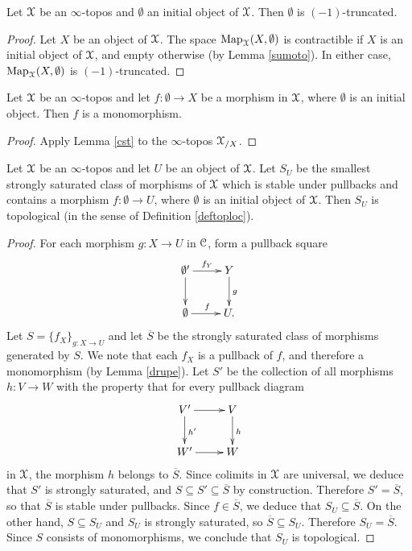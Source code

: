 \begin{lemma}\label{cst}
Let $\operatorname{\mathcal{X}}$ be an $\infty$-topos and $\emptyset$ an initial object of $\operatorname{\mathcal{X}}$. Then $\emptyset$ is $(-1)$-truncated.
\end{lemma}

\begin{proof}
Let $X$ be an object of $\operatorname{\mathcal{X}}$. The space $\operatorname{{Map}}_{\operatorname{\mathcal{X}}}(X, \emptyset)$ is contractible if $X$ is an initial object of $\operatorname{\mathcal{X}}$, and empty otherwise (by Lemma \ref{sumoto}). In either case,
$\operatorname{{Map}}_{\operatorname{\mathcal{X}}}(X, \emptyset)$ is $(-1)$-truncated.
\end{proof}

\begin{lemma}\label{drupe}
Let $\operatorname{\mathcal{X}}$ be an $\infty$-topos and let $f: \emptyset \rightarrow X$ be a morphism in $\operatorname{\mathcal{X}}$, where $\emptyset$ is an initial object. Then $f$ is a monomorphism.
\end{lemma}

\begin{proof}
Apply Lemma \ref{cst} to the $\infty$-topos $\operatorname{\mathcal{X}}_{/X}$.
\end{proof}

\begin{proposition}\label{turb}
Let $\operatorname{\mathcal{X}}$ be an $\infty$-topos and let $U$ be an object of $\operatorname{\mathcal{X}}$. Let
$S_{U}$ be the smallest strongly saturated class of morphisms of $\operatorname{\mathcal{X}}$ which is stable under pullbacks and contains a morphism $f: \emptyset \rightarrow U$, where $\emptyset$ is an initial object of $\operatorname{\mathcal{X}}$. Then $S_{U}$ is topological (in the sense of Definition \ref{deftoploc}).
\end{proposition}

\begin{proof}
For each morphism $g: X \rightarrow U$ in $\operatorname{\mathcal{C}}$, form a pullback square
$$ \xymatrix{ \emptyset' \ar[r]^{f_{Y}} \ar[d] & Y \ar[d]^{g} \\
\emptyset \ar[r]^{f} & U. }$$
Let $S = \{ f_{X} \}_{ g: X \rightarrow U}$ and let $\overline{S}$ be the strongly saturated class of morphisms generated by $S$. We note that each $f_{X}$ is a pullback of $f$, and therefore a monomorphism (by Lemma \ref{drupe}). Let $S'$ be the collection of all morphisms $h: V \rightarrow W$ with the property that for every pullback diagram
$$ \xymatrix{ V' \ar[r] \ar[d]^{h'} & V \ar[d]^{h} \\
W' \ar[r] & W }$$
in $\operatorname{\mathcal{X}}$, the morphism $h$ belongs to $\overline{S}$. Since colimits in $\operatorname{\mathcal{X}}$ are universal, we deduce that $S'$ is strongly saturated, and $S \subseteq S' \subseteq \overline{S}$ by construction. Therefore $S' = \overline{S}$, so that $\overline{S}$ is stable under pullbacks. Since
$f \in \overline{S}$, we deduce that $S_{U} \subseteq \overline{S}$. On the other hand,
$S \subseteq S_{U}$ and $S_{U}$ is strongly saturated, so $\overline{S} \subseteq S_U$.
Therefore $S_{U} = \overline{S}$. Since $S$ consists of monomorphisms, we conclude that $S_{U}$ is topological.
\end{proof}

